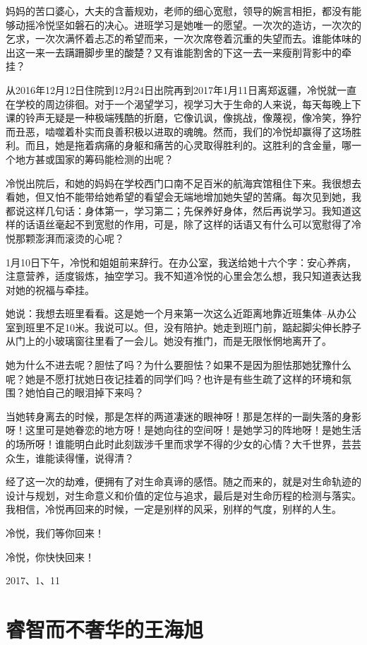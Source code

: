 \documentclass[openany]{ctexbook}
\begin{document}
妈妈的苦口婆心，大夫的含蓄规劝，老师的细心宽慰，领导的婉言相拒，都没有能够动摇冷悦坚如磐石的决心。进班学习是她唯一的愿望。一次次的造访，一次次的乞求，一次次满怀着忐忑的希望而来，一次次席卷着沉重的失望而去。谁能体味的出这一来一去蹒跚脚步里的酸楚？又有谁能割舍的下这一去一来瘦削背影中的牵挂？

从2016年12月12日住院到12月24日出院再到2017年1月11日离郑返疆，冷悦就一直在学校的周边徘徊。对于一个渴望学习，视学习大于生命的人来说，每天每晚上下课的铃声无疑是一种极端残酷的折磨，它像讥讽，像挑战，像蔑视，像冷笑，狰狞而丑恶，啮噬着朴实而良善积极以进取的魂魄。然而，我们的冷悦却赢得了这场胜利。而且，她是拖着病痛的身躯和痛苦的心灵取得胜利的。这胜利的含金量，哪一个地方甚或国家的筹码能检测的出呢？

冷悦出院后，和她的妈妈在学校西门口南不足百米的航海宾馆租住下来。我很想去看她，但又怕不能带给她希望的看望会无端地增加她失望的苦痛。每次见到她，我都说这样几句话：身体第一，学习第二；先保养好身体，然后再说学习。我知道这样的话语丝毫起不到宽慰的作用，可是，除了这样的话语又有什么可以宽慰得了冷悦那颗澎湃而滚烫的心呢？

1月10日下午，冷悦和姐姐前来辞行。在办公室，我送给她十六个字：安心养病，注意营养，适度锻炼，抽空学习。我不知道冷悦的心里会怎么想，我只知道表达我对她的祝福与牵挂。

她说：我想去班里看看。这是她一个月来第一次这么近距离地靠近班集体--从办公室到班里不足10米。我说可以。但，没有陪护。她走到班门前，踮起脚尖伸长脖子从门上的小玻璃窗往里看了一会儿。她没有推门，而是无限怅惘地离开了。

她为什么不进去呢？胆怯了吗？为什么要胆怯？如果不是因为胆怯那她犹豫什么呢？她是不愿打扰她日夜记挂着的同学们吗？也许是有些生疏了这样的环境和氛围？她怕自己的眼泪掉下来吗？

当她转身离去的时候，那是怎样的两道凄迷的眼神呀！那是怎样的一副失落的身影呀！这里可是她眷恋的地方呀！是她向往的空间呀！是她学习的阵地呀！是她生活的场所呀！谁能明白此时此刻跋涉千里而求学不得的少女的心情？大千世界，芸芸众生，谁能读得懂，说得清？

经了这一次的劫难，便拥有了对生命真谛的感悟。随之而来的，就是对生命轨迹的设计与规划，对生命意义和价值的定位与追求，最后是对生命历程的检测与落实。我相信，冷悦再回来的时候，一定是别样的风采，别样的气度，别样的人生。

冷悦，我们等你回来！

冷悦，你快快回来！

2017、1、11

\chapter*{睿智而不奢华的王海旭}\label{wanghaixu}
\end{document}
